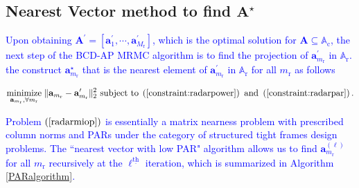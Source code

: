\documentclass[9pt,journal]{IEEEtran}
\newcommand{\paren}[1]{\left({#1}\right)}
\newcommand{\bracket}[1]{{\left [{#1}\right ]}}
\newcommand{\ith}[1]    {{#1}^{\underline{\text{th}}}}
\newcommand{\rr}{_\mathrm{r}}
\theoremstyle{definition}
\begin{document}
\subsection{Nearest Vector method to find $\mathbf{A}^\star$}
\label{subsec: PAR}
\textcolor{blue}{Upon obtaining $\mathbf{A}^\prime=\bracket{\mathbf{a}^\prime_{1},\cdots,\mathbf{a}^\prime_{M\rr}}$, which is the optimal solution for $\mathbf{A}\subseteq\mathbb{A}_{\textrm{c}}$, the next step of the BCD-AP MRMC algorithm is to find the projection of $\mathbf{a}^\prime_{m\rr}$ in $\mathbb{A}_{\textrm{r}}$. 
the construct $\mathbf{a}^\star_{m\rr}$ that is the nearest element of $\mathbf{a}^\prime_{m\rr}$ in $\mathbb{A}_{\textrm{r}}$ for all $m\rr$ as follows}
\par\noindent\small
\begin{equation}
\label{radarmiop}
\underset{\mathbf{a}_{m\rr},\forall m\rr}{\text{minimize}}\;\lVert\mathbf{a}_{m\rr}-\mathbf{a}^\prime_{m\rr}\rVert^2_2\text{ subject to}\;  \paren{\mathrm{\ref{constraint:radarpower}}}\textrm{ and }\paren{\mathrm{\ref{constraint:radarpar}}}.    
\end{equation}

\textcolor{blue}{Problem $\paren{\ref{radarmiop}}$ is essentially a matrix nearness problem with prescribed column norms and PARs under the category of structured tight frames design problems\cite{nearestvector,arXiv180203889Z}. The ``nearest vector with low PAR" algorithm \cite{nearestvector} allows us to find $\mathbf{a}^{\paren{\ell}}_{m\rr}$ for all $m\rr$ recursively at the $\ith{\ell}$ iteration, which is summarized in Algorithm \ref{PARalgorithm}.}
\end{document}
